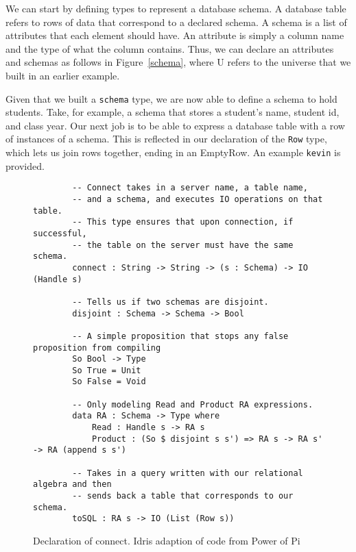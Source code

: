 We can start by defining types to represent a database schema. A database table
refers to rows of data that correspond to a declared schema. A schema is a list
of attributes that each element should have. An attribute is simply a column
name and the type of what the column contains. Thus, we can declare an
attributes and schemas as follows in Figure~\ref{schema}, where U refers to the
universe that we built in an earlier example. 

Given that we built a \texttt{schema} type, we are now able to define a schema
to hold students. Take, for example, a schema that stores a student's name,
student id, and class year. Our next job is to be able to express a database
table with a row of instances of a schema. This is reflected in our declaration
of the \texttt{Row} type, which lets us join rows together, ending in an
EmptyRow. An example \texttt{kevin} is provided. 

\begin{figure}[ht!]
    \caption{Declaration of connect. Idris adaption of code from Power of Pi
    \protect\cite{power_of_pi}}
    \label{connect}
    \begin{lstlisting}
        -- Connect takes in a server name, a table name, 
        -- and a schema, and executes IO operations on that table. 
        -- This type ensures that upon connection, if successful, 
        -- the table on the server must have the same schema. 
        connect : String -> String -> (s : Schema) -> IO (Handle s)

        -- Tells us if two schemas are disjoint. 
        disjoint : Schema -> Schema -> Bool

        -- A simple proposition that stops any false proposition from compiling
        So Bool -> Type
        So True = Unit
        So False = Void

        -- Only modeling Read and Product RA expressions.
        data RA : Schema -> Type where
            Read : Handle s -> RA s
            Product : (So $ disjoint s s') => RA s -> RA s' -> RA (append s s')
        
        -- Takes in a query written with our relational algebra and then 
        -- sends back a table that corresponds to our schema. 
        toSQL : RA s -> IO (List (Row s))
    \end{lstlisting}
\end{figure}

